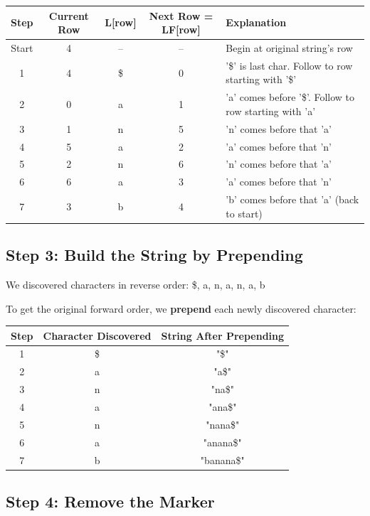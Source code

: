 \begin{examplebox}[Step-by-Step Inversion of "annb\$aa" with I=4]
\begin{center}
\begin{tabularx}{\textwidth}{|c|c|c|c|X|}
\hline
\textbf{Step} & \textbf{Current Row} & \textbf{L[row]} & \textbf{Next Row = LF[row]} & \textbf{Explanation} \\
\hline
Start & 4 & -- & -- & Begin at original string's row \\
1 & 4 & \$ & 0 & '\$' is last char. Follow to row starting with '\$' \\
2 & 0 & a & 1 & 'a' comes before '\$'. Follow to row starting with 'a' \\
3 & 1 & n & 5 & 'n' comes before that 'a' \\
4 & 5 & a & 2 & 'a' comes before that 'n' \\
5 & 2 & n & 6 & 'n' comes before that 'a' \\
6 & 6 & a & 3 & 'a' comes before that 'n' \\
7 & 3 & b & 4 & 'b' comes before that 'a' (back to start) \\
\hline
\end{tabularx}
\end{center}

\subsection*{Step 3: Build the String by Prepending}

We discovered characters in reverse order: \$, a, n, a, n, a, b

To get the original forward order, we \textbf{prepend} each newly discovered character:

\begin{center}
\begin{tabular}{|c|c|c|}
\hline
\textbf{Step} & \textbf{Character Discovered} & \textbf{String After Prepending} \\
\hline
1 & \$ & "\$" \\
2 & a & "a\$" \\
3 & n & "na\$" \\
4 & a & "ana\$" \\
5 & n & "nana\$" \\
6 & a & "anana\$" \\
7 & b & "banana\$" \\
\hline
\end{tabular}
\end{center}

\subsection*{Step 4: Remove the Marker}


\end{examplebox}
